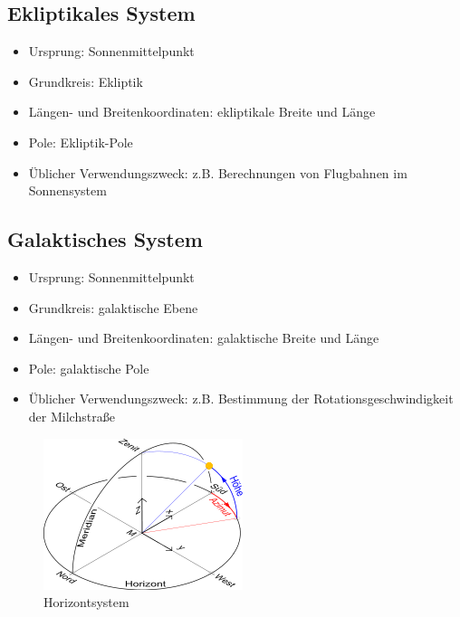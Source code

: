 \documentclass[titlepage]{scrartcl}
\begin{document}
\subsection{Ekliptikales System}

\begin{itemize}
\item Ursprung: Sonnenmittelpunkt
\item Grundkreis: Ekliptik
\item Längen- und Breitenkoordinaten: ekliptikale Breite und Länge
\item Pole: Ekliptik-Pole
\item Üblicher Verwendungszweck: z.B. Berechnungen von Flugbahnen im Sonnensystem
\end{itemize}

\subsection{Galaktisches System}

\begin{itemize}
\item Ursprung: Sonnenmittelpunkt
\item Grundkreis: galaktische Ebene
\item Längen- und Breitenkoordinaten: galaktische Breite und Länge
\item Pole: galaktische Pole
\item Üblicher Verwendungszweck: z.B. Bestimmung der Rotationsgeschwindigkeit der Milchstraße
\end{itemize}

\begin{figure}
        \includegraphics[width=.9\textwidth]{images/Horizontsystem}
\caption{ Horizontsystem }
\label{fig:Horizontsystem}
\end{figure}
\end{document}
